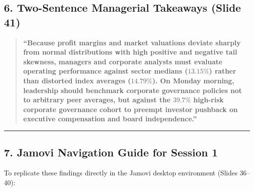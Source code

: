 \documentclass[
]{article}
\begin{document}
\subsection{6. Two-Sentence Managerial Takeaways (Slide
41)}\label{two-sentence-managerial-takeaways-slide-41}

\begin{quote}
\textbf{``Because profit margins and market valuations deviate sharply
from normal distributions with high positive and negative tail skewness,
managers and corporate analysts must evaluate operating performance
against sector medians (\(13.15\%\)) rather than distorted index
averages (\(14.79\%\)). On Monday morning, leadership should benchmark
corporate governance policies not to arbitrary peer averages, but
against the \(39.7\%\) high-risk corporate governance cohort to preempt
investor pushback on executive compensation and board independence.''}
\end{quote}

\begin{center}\rule{0.5\linewidth}{0.5pt}\end{center}

\subsection{7. Jamovi Navigation Guide for Session
1}\label{jamovi-navigation-guide-for-session-1}

To replicate these findings directly in the Jamovi desktop environment
(Slides 36--40):
\end{document}
